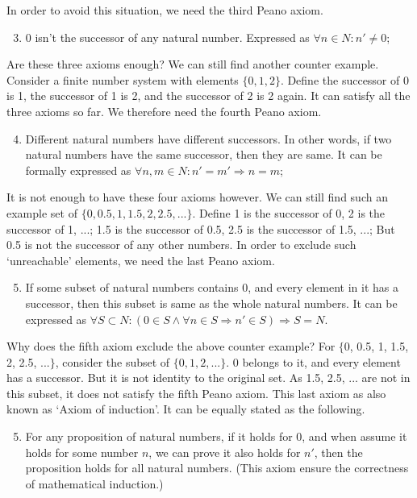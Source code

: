 \documentclass[UTF8]{article}
\begin{document}
In order to avoid this situation, we need the third Peano axiom.

\begin{enumerate}
  \setcounter{enumi}{2}
  \item 0 isn't the successor of any natural number. Expressed as $\forall n \in N: n' \neq 0$;
\end{enumerate}

Are these three axioms enough? We can still find another counter example. Consider a finite number system with elements $\{0, 1, 2\}$. Define the successor of 0 is 1, the successor of 1 is 2, and the successor of 2 is 2 again. It can satisfy all the three axioms so far. We therefore need the fourth Peano axiom.

\begin{enumerate}
  \setcounter{enumi}{3}
  \item Different natural numbers have different successors. In other words, if two natural numbers have the same successor, then they are same. It can be formally expressed as $\forall n, m \in N: n' = m' \Rightarrow n = m$;
\end{enumerate}

It is not enough to have these four axioms however. We can still find such an example set of $\{0, 0.5, 1, 1.5, 2, 2.5, ...\}$. Define 1 is the successor of 0, 2 is the successor of 1, ...; 1.5 is the successor of 0.5, 2.5 is the successor of 1.5, ...; But 0.5 is not the successor of any other numbers. In order to exclude such `unreachable' elements, we need the last Peano axiom.

\begin{enumerate}
  \setcounter{enumi}{4}
  \item If some subset of natural numbers contains 0, and every element in it has a successor, then this subset is same as the whole natural numbers. It can be expressed as $\forall S \subset N: (0 \in S \land \forall n \in S \Rightarrow n' \in S) \Rightarrow S = N$.
\end{enumerate}

Why does the fifth axiom exclude the above counter example? For $\{$0, 0.5, 1, 1.5, 2, 2.5, ...$\}$, consider the subset of $\{0, 1, 2, ...\}$. 0 belongs to it, and every element has a successor. But it is not identity to the original set. As 1.5, 2.5, ... are not in this subset, it does not satisfy the fifth Peano axiom. This last axiom as also known as `Axiom of induction'. It can be equally stated as the following.

\begin{enumerate}
  \setcounter{enumi}{4}
  \item For any proposition of natural numbers, if it holds for 0, and when assume it holds for some number $n$, we can prove it also holds for $n'$, then the proposition holds for all natural numbers. (This axiom ensure the correctness of mathematical induction.)
\end{enumerate}
\end{document}
